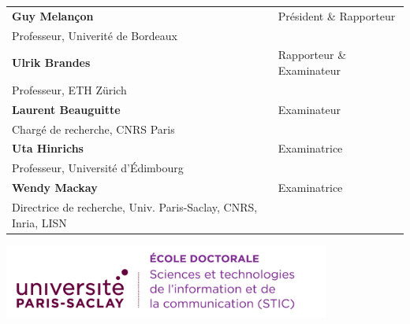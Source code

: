 \documentclass[12pt,a4paper, twoside, headings=small]{book}
\begin{document}
\begin{titlepage}
        \begin{tabular}{|p{9cm}l}
            \arrayrulecolor{Prune}
            \textbf{Guy Melançon} & Président \& Rapporteur \\
            Professeur, Univerité de Bordeaux  &                                   \\
            \textbf{Ulrik Brandes} & Rapporteur \& Examinateur \\
            Professeur, ETH Zürich  &                                   \\
            \textbf{Laurent Beauguitte} & Examinateur       \\
            Chargé de recherche, CNRS Paris  &                                   \\
            \textbf{Uta Hinrichs} & Examinatrice       \\
            Professeur, Université d'Édimbourg  &                                   \\
            \textbf{Wendy Mackay} & Examinatrice       \\
            Directrice de recherche, Univ. Paris-Saclay, CNRS, Inria, LISN  &   \\
        \end{tabular}
    \end{titlepage}

    \Ifthispageodd{\newpage\thispagestyle{empty}\null\newpage}{}
    \thispagestyle{empty}
    \selectfont

    \lhead{}
    \rhead{}
    \rfoot{}
    \cfoot{}
    \lfoot{}

    \noindent
    \includegraphics[height=2.45cm]{static/logos/logo_usp_STIC}
    \vspace{1cm}
    \selectfont
\end{document}
